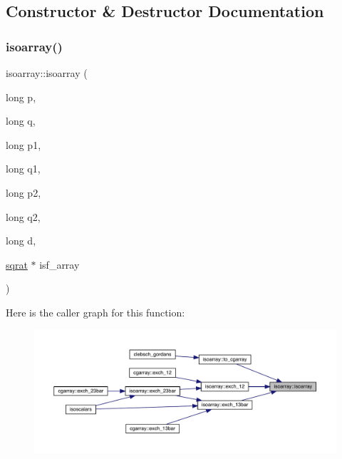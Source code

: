 \subsection{Constructor \& Destructor Documentation}
\mbox{\label{classisoarray_a2255ec3a14431cdc95ea8d0b0150fde6}} 
\subsubsection{\texorpdfstring{isoarray()}{isoarray()}\hspace{0.1cm}{\footnotesize\ttfamily [1/2]}}
{\footnotesize\ttfamily isoarray\+::isoarray (\begin{DoxyParamCaption}\item[{long}]{p,  }\item[{long}]{q,  }\item[{long}]{p1,  }\item[{long}]{q1,  }\item[{long}]{p2,  }\item[{long}]{q2,  }\item[{long}]{d,  }\item[{\mbox{\hyperlink{classsqrat}{sqrat}} $\ast$}]{isf\+\_\+array }\end{DoxyParamCaption})}

Here is the caller graph for this function\+:\nopagebreak
\begin{figure}[H]
\begin{center}
\leavevmode
\includegraphics[width=350pt]{d5/dd9/classisoarray_a2255ec3a14431cdc95ea8d0b0150fde6_icgraph}
\end{center}
\end{figure}
\mbox{\label{classisoarray_ab1ff7ca3e0edb468608b42d2d2aad08b}} 

